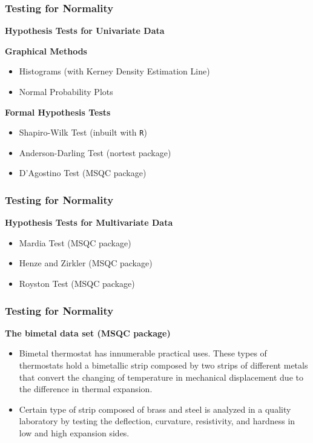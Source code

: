 \documentclass{beamer}
\begin{document}
\begin{frame}[fragile]
\frametitle{Testing for Normality}
	{
	\noindent\textbf{Hypothesis Tests for Univariate Data}
	
	\bigskip		\large
		\textbf{Graphical Methods}
		\begin{itemize}
			\item Histograms (with Kerney Density Estimation Line)
			\item Normal Probability Plots
		\end{itemize}
		\bigskip		\large
		\textbf{Formal Hypothesis Tests}
			\begin{itemize}
				\item Shapiro-Wilk Test (inbuilt with \texttt{R})
				\item Anderson-Darling Test (nortest package)
				\item D'Agostino Test (MSQC package)
			\end{itemize}
	}
\end{frame}

\begin{frame}[fragile]
	\frametitle{Testing for Normality}

	
	\noindent\textbf{Hypothesis Tests for Multivariate Data}
	\begin{itemize}
		\item Mardia Test (MSQC package)
		\item Henze and Zirkler (MSQC package)
		\item Royston Test (MSQC package)
	\end{itemize}
\end{frame}
\begin{frame}[fragile]
	\frametitle{Testing for Normality}
	
	\textbf{The bimetal data set (MSQC package)}
	{\large
		\begin{itemize}
			\item Bimetal thermostat has innumerable practical uses. These types of thermostats hold
			a bimetallic strip composed by two strips of different metals that convert the
			changing of temperature in mechanical displacement due to the difference in
			thermal expansion.
			\item Certain type of strip composed of brass and steel is analyzed in a quality
			laboratory by testing the deflection, curvature, resistivity, and hardness in low
			and high expansion sides.
		\end{itemize}
	}
	\end{frame}
\end{document}
